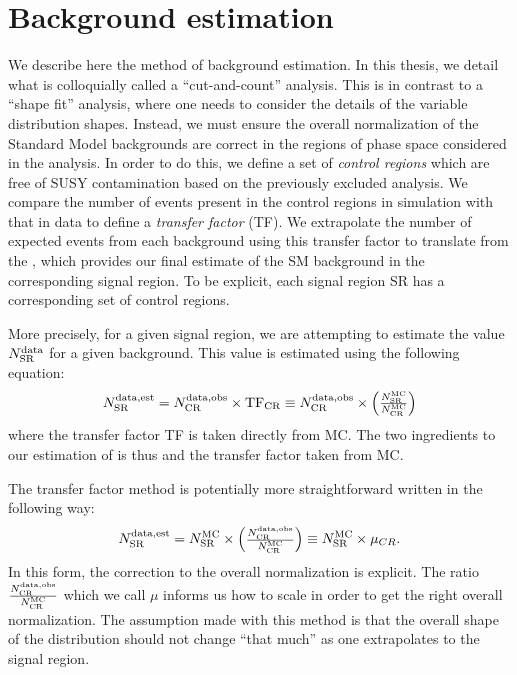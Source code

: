 

\section{Background estimation}

We describe here the method of background estimation.
In this thesis, we detail what is colloquially called a ``cut-and-count'' analysis.
This is in contrast to a ``shape fit'' analysis, where one needs to consider the details of the variable distribution shapes.
Instead, we must ensure the overall normalization of the Standard Model backgrounds are correct in the regions of phase space considered in the analysis.
In order to do this, we define a set of \textit{control regions} which are free of SUSY contamination based on the previously excluded analysis.
We compare the number of events present in the control regions in simulation with that in data to define a \textit{transfer factor} (TF).
We extrapolate the number of expected events from each background using this transfer factor to translate from the , which provides our final estimate of the SM background in the corresponding signal region.
To be explicit, each signal region SR has a corresponding set of control regions.

More precisely, for a given signal region, we are attempting to estimate the value $\ntext{SR}{data}$ for a given background.
This value is estimated using the following equation:
\begin{align}\label{eq:bkg_est}
\ntext{SR}{data,est} = \ntext{CR}{data,obs} \times \text{TF}_{\text{CR}} \equiv \ntext{CR}{data,obs} \times  \begin{pmatrix} \frac{ \ntext{SR}{MC} }{ \ntext{CR}{MC} } \end{pmatrix}
\end{align}
where the transfer factor TF is taken directly from MC.
The two ingredients to our estimation of  is thus  and the transfer factor taken from MC.

The transfer factor method is potentially more straightforward written in the following way:
\begin{align}\label{eq:bkg_est_simple}
\ntext{SR}{data,est} = \ntext{SR}{MC} \times  \begin{pmatrix} \frac{\ntext{CR}{data,obs}  }{ \ntext{CR}{MC} } \end{pmatrix} \equiv \ntext{SR}{MC} \times \mu_{CR}.
\end{align}
In this form, the correction to the overall normalization is explicit.
The ratio $\frac{\ntext{CR}{data,obs}}{ \ntext{CR}{MC} }$ which we call $\mu$ informs us how to scale  in order to get the right overall normalization.
The assumption made with this method is that the overall shape of the distribution should not change ``that much'' as one extrapolates to the signal region.

